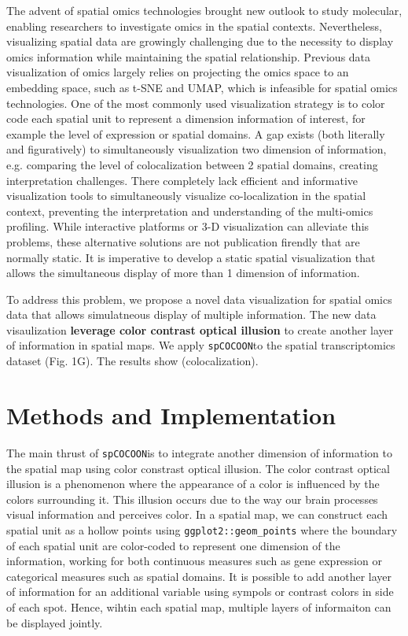 \documentclass[11pt]{article}
\newcommand{\fixme}[1]{{\color{red} (#1)}}
\newcommand{\coloc}{\texttt{spCOCOON}}
\begin{document}
 The advent of spatial omics technologies brought new outlook to study molecular, enabling researchers to investigate omics in the spatial contexts. Nevertheless, visualizing spatial data are growingly challenging due to the necessity to display omics information while maintaining the spatial relationship. Previous data visualization of omics largely relies on projecting the omics space to an embedding space, such as t-SNE and UMAP, which is infeasible for spatial omics technologies. One of the most commonly used visualization strategy is to color code each spatial unit to represent a dimension information of interest, for example the level of expression or spatial domains. A gap exists (both literally and figuratively) to simultaneously visualization two dimension of information, e.g. comparing the level of colocalization between 2 spatial domains, creating interpretation challenges. There completely lack efficient and informative visualization tools to simultaneously visualize co-localization in the spatial context, preventing the interpretation and understanding of the multi-omics profiling. While interactive platforms or 3-D visualization can alleviate this problems, these alternative solutions are not publication firendly that are normally static. It is imperative to develop a static spatial visualization that allows the simultaneous display of more than 1 dimension of information. 
 
\noindent To address this problem, we propose a novel data visualization for spatial omics data that allows simulatneous display of multiple information. The new data visaulization \textbf{leverage color contrast optical illusion}\cite{zhang_2018} to create another layer of information in spatial maps. We apply \coloc to the spatial transcriptomics dataset (Fig. 1G). The results show \fixme{colocalization}.


\section*{Methods and Implementation}
The main thrust of \coloc is to integrate another dimension of information to the spatial map using color constrast optical illusion. The color contrast optical illusion is a phenomenon where the appearance of a color is influenced by the colors surrounding it. This illusion occurs due to the way our brain processes visual information and perceives color. In a spatial map, we can construct each spatial unit as a hollow points using \texttt{ggplot2::geom\_points} where the boundary of each spatial unit are color-coded to represent one dimension of the information, working for both continuous measures such as gene expression or categorical measures such as spatial domains. It is possible to add another layer of information for an additional variable using sympols or contrast colors in side of each spot. Hence, wihtin each spatial map, multiple layers of informaiton can be displayed jointly.
\end{document}
